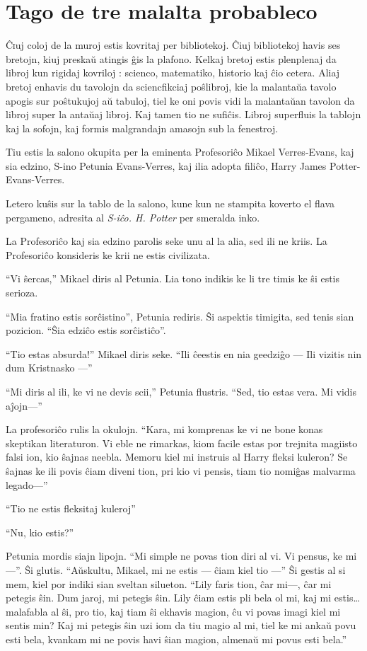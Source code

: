 \chapter{Tago de tre malalta probableco}

\lettrine{Ĉ}iuj coloj de la muroj estis kovritaj per bibliotekoj. Ĉiuj
bibliotekoj havis ses bretojn, kiuj preskaŭ atingis ĝis la
plafono. Kelkaj bretoj estis plenplenaj da libroj kun rigidaj kovriloj
: scienco, matematiko, historio kaj ĉio cetera. Aliaj bretoj enhavis
du tavolojn da sciencfikciaj poŝlibroj, kie la malantaŭa tavolo
apogis sur poŝtukujoj aŭ tabuloj, tiel ke oni povis vidi la malantaŭan
tavolon da libroj super la antaŭaj libroj. Kaj tamen tio ne
sufiĉis. Libroj superfluis la tablojn kaj la sofojn, kaj formis
malgrandajn amasojn sub la fenestroj.

Tiu estis la salono okupita per la eminenta Profesoriĉo Mikael
Verres-Evans, kaj sia edzino, S-ino Petunia Evans-Verres, kaj
ilia adopta filiĉo, Harry James Potter-Evans-Verres. 

Letero kuŝis sur la tablo de la salono, kune kun ne stampita koverto
el flava pergameno, adresita al \emph{S-iĉo. H. Potter} per smeralda
inko.

La Profesoriĉo kaj sia edzino parolis seke unu al la alia, sed ili ne
kriis. La Profesoriĉo konsideris ke krii ne estis civilizata.

``Vi ŝercas,'' Mikael diris al Petunia. Lia tono indikis ke li tre
timis ke ŝi estis serioza.

``Mia fratino estis sorĉistino'', Petunia rediris. Ŝi aspektis timigita,
sed tenis sian pozicion. ``Ŝia edziĉo estis sorĉistiĉo''.

``Tio estas absurda!'' Mikael diris seke. ``Ili ĉeestis en nia geedziĝo — Ili
vizitis nin dum Kristnasko —''

``Mi diris al ili, ke vi ne devis scii,'' Petunia flustris. ``Sed, tio
estas vera. Mi vidis aĵojn—''

La profesoriĉo rulis la okulojn. ``Kara, mi komprenas ke vi ne bone
konas skeptikan literaturon. Vi eble ne rimarkas, kiom facile estas por
trejnita magiisto falsi ion, kio ŝajnas neebla. Memoru kiel mi
instruis al Harry fleksi kuleron? Se ŝajnas ke ili povis ĉiam diveni
tion, pri kio vi pensis, tiam tio nomiĝas malvarma legado—''

``Tio ne estis fleksitaj kuleroj''

``Nu, kio estis?''

Petunia mordis siajn lipojn. ``Mi simple ne povas tion diri al vi. Vi
pensus, ke mi —''. Ŝi glutis. ``Aŭskultu, Mikael, mi ne estis — ĉiam
kiel tio —'' Ŝi gestis al si mem, kiel por indiki sian sveltan
silueton. ``Lily faris tion, ĉar mi—, ĉar mi petegis ŝin. Dum jaroj,
mi petegis ŝin. Lily ĉiam estis pli bela ol mi, kaj mi estis\ldots{}
malafabla al ŝi, pro tio, kaj tiam ŝi ekhavis magion, ĉu vi povas
imagi kiel mi sentis min?  Kaj mi petegis ŝin uzi iom da tiu magio al
mi, tiel ke mi ankaŭ povu esti bela, kvankam mi ne povis havi ŝian
magion, almenaŭ mi povus esti bela.''

